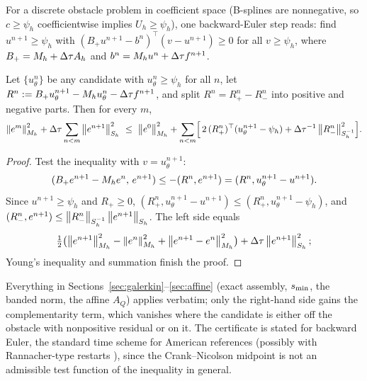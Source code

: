 For a discrete obstacle problem in coefficient space (B-splines are
nonnegative, so $c\ge\psi_h$ coefficientwise implies $U_h\ge\psi_h$), one
backward-Euler step reads: find $u^{n+1}\ge\psi_h$ with
$(B_+u^{n+1}-b^n)^\top(v-u^{n+1})\ge0$ for all $v\ge\psi_h$, where
$B_+=M_h+\Delta\tau A_h$ and $b^n=M_h u^n+\Delta\tau f^{n+1}$.
\begin{theorem}
\label{thm:vi}
Let $\{u_\theta^n\}$ be any candidate with $u_\theta^n\ge\psi_h$ for all $n$,
let $R^n:=B_+u_\theta^{n+1}-M_h u_\theta^n-\Delta\tau f^{n+1}$, and split
$R^n=R^n_+-R^n_-$ into positive and negative parts.  Then for every $m$,
\[
 \left\lVert e^m\right\rVert_{M_h}^2+\Delta\tau\sum_{n<m}\left\lVert e^{n+1}\right\rVert_{S_h}^2
 \ \le\ \left\lVert e^0\right\rVert_{M_h}^2
 +\sum_{n<m}\Bigl[\,2\,(R^n_+)^\top(u_\theta^{n+1}-\psi_h)
 +\Delta\tau^{-1}\left\lVert R^n_-\right\rVert_{S_h^{-1}}^2\Bigr].
\]
\end{theorem}
\begin{proof}
Test the inequality with $v=u_\theta^{n+1}$:
\[
(B_+e^{n+1}-M_h e^n,\,e^{n+1})\le-(R^n,e^{n+1})=(R^n,u_\theta^{n+1}-u^{n+1}).
\]
Since $u^{n+1}\ge\psi_h$ and $R_+\ge0$, $(R^n_+,u_\theta^{n+1}-u^{n+1})\le(R^n_+,u_\theta^{n+1}-\psi_h)$,
and $(R^n_-,e^{n+1})\le\left\lVert R^n_-\right\rVert_{S_h^{-1}}\left\lVert e^{n+1}\right\rVert_{S_h}$.  The left side equals
\[
\tfrac12\bigl(\left\lVert e^{n+1}\right\rVert_{M_h}^2-\left\lVert e^n\right\rVert_{M_h}^2+\left\lVert e^{n+1}-e^n\right\rVert_{M_h}^2\bigr)+\Delta\tau\left\lVert e^{n+1}\right\rVert_{S_h}^2;
\]
Young's inequality and summation finish the proof.
\end{proof}
Everything in Sections~\ref{sec:galerkin}--\ref{sec:affine} (exact assembly, $s_{\min}$, the banded norm,
the affine $A_Q$) applies verbatim; only the right-hand side gains the
complementarity term, which vanishes where the candidate is either off the
obstacle with nonpositive residual or on it.  The certificate is stated for
backward Euler, the standard time scheme for American references (possibly
with Rannacher-type restarts \cite{Rannacher1984}), since the Crank--Nicolson midpoint is not an
admissible test function of the inequality in general.

